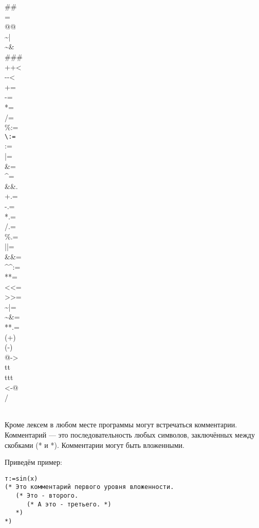 \documentclass[10pt]{report}
\begin{document}
\begin{center}
\begin{multicols}{10}
\#\#\\
=\\
@@\\
\~{ }|\\
\~{ }\&\\
\#\#\#\\
+{}+<\\
-{}-<\\
+=\\
-=\\
*=\\
/=\\
\%:=\\
\verb"\:="\\
:=\\
|=\\
\&=\\
\^{ }=\\
\&\&.\\
+.=\\
-.=\\
*.=\\
/.=\\
\%.=\\
||=\\
\&\&=\\
\^{ }\^{ }:=\\
**=\\
<{}<=\\
>{}>=\\
\~{ }|=\\
\~{ }\&=\\
**.=\\
(+)\\
(-)\\
@->\\
tt\\
ttt\\
<-@\\

/\\\


\end{multicols}
\end{center}

Кроме лексем в любом месте программы могут встречаться комментарии. Комментарий --- это последовательность любых символов, заключённых между скобками (* и *). Комментарии
могут быть вложенными.


Приведём пример:
\begin{verbatim}
т:=sin(x)
(* Это комментарий первого уровня вложенности.
   (* Это - второго.
      (* А это - третьего. *)
   *)
*)
\end{verbatim}
\end{document}
